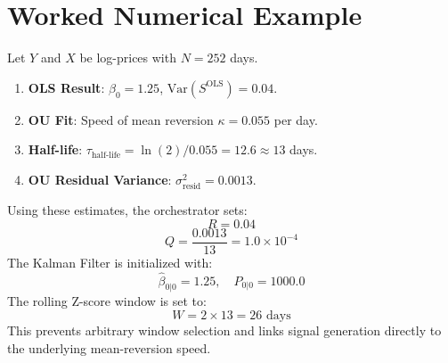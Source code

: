 \documentclass[10pt,a4paper,twocolumn]{article}
\newcommand{\tauhl}{\tau_{\text{half-life}}}
\begin{document}
\section{Worked Numerical Example}

\begin{tcolorbox}[exbox={Pipeline Initialization Example}]
Let $Y$ and $X$ be log-prices with $N=252$ days.
\begin{enumerate}\setlength\itemsep{0pt}
  \item \textbf{OLS Result}: $\beta_0 = 1.25$, $\text{Var}(S^{\text{OLS}}) = 0.04$.
  \item \textbf{OU Fit}: Speed of mean reversion $\kappa = 0.055$ per day.
  \item \textbf{Half-life}: $\tauhl = \ln(2)/0.055 = 12.6 \approx 13$ days.
  \item \textbf{OU Residual Variance}: $\sigma_{\text{resid}}^2 = 0.0013$.
\end{enumerate}
\end{tcolorbox}

Using these estimates, the orchestrator sets:
\[
  R = 0.04
\]
\[
  Q = \frac{0.0013}{13} = 1.0 \times 10^{-4}
\]
The Kalman Filter is initialized with:
\[
  \hat{\beta}_{0|0} = 1.25, \quad P_{0|0} = 1000.0
\]
The rolling Z-score window is set to:
\[
  W = 2 \times 13 = 26 \text{ days}
\]
This prevents arbitrary window selection and links signal generation directly to the underlying mean-reversion speed.\\
\vspace{1 cm}

\end{document}
